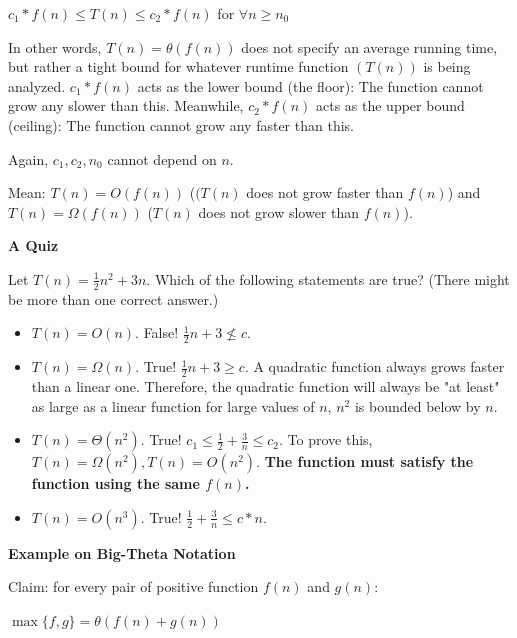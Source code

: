 \documentclass[11pt]{article}
\begin{document}
\vspace{11pt}
\begin{center}
    $c_1*f(n)\leq T(n) \leq c_2 *f(n)$ for $\forall n \geq n_0$
\end{center}
\vspace{11pt}

In other words, $T(n)=\theta(f(n))$ does not specify an average running time, but rather a tight bound for whatever runtime function $(T(n))$ is being analyzed. $c_1*f(n)$ acts as the lower bound (the floor): The function cannot grow any slower than this. Meanwhile, $c_2*f(n)$ acts as the upper bound (ceiling): The function cannot grow any faster than this.

Again, $c_1,c_2,n_0$ cannot depend on $n$.

Mean: $T(n)=O(f(n))$ ($(T(n)$ does not grow faster than $f(n)$) and $T(n)=\Omega(f(n))$ ($T(n)$ does not grow slower than $f(n)$).

\vspace{11pt}
\textbf{A Quiz}
\vspace{11pt}

Let $T(n)=\frac12n^2+3n$. Which of the following statements are true? (There might be more than one correct answer.)
\begin{itemize}
    \item $T(n)=O(n)$. False! $\frac{1}{2}n+3 \not\leq c$.
    \item $T(n)=\Omega(n)$. True! $\frac12n+3 \geq c$. A quadratic function always grows faster than a linear one. Therefore, the quadratic function will always be "at least" as large as a linear function for large values of $n$, $n^2$ is bounded below by $n$.
    \item $T(n)=\Theta(n^2)$. True! $c_1 \leq \frac12+\frac3n \leq c_2$. To prove this, $T(n)=\Omega(n^2),T(n)=O(n^2)$.\textbf{ The function must satisfy the function using the same $f(n)$.}
    \item $T(n)=O(n^3)$. True! $\frac12+\frac3n \leq c*n$.
\end{itemize}
\vspace{11pt}

\textbf{Example on Big-Theta Notation}

Claim: for every pair of positive function $f(n)$ and $g(n)$:

\vspace{11pt}
\begin{center}
    $\max\{f,g\}=\theta(f(n)+g(n))$
\end{center}
\vspace{11pt}
\end{document}
